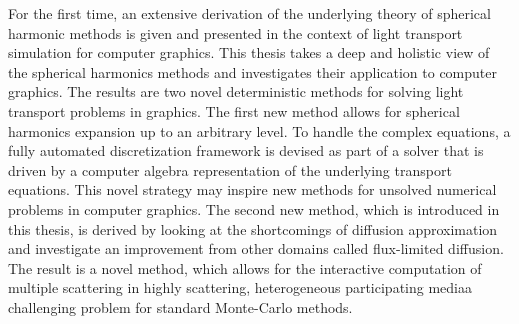 For the first time, an extensive derivation of the underlying theory of spherical harmonic methods is given and presented in the context of light transport simulation for computer graphics. This thesis takes a deep and holistic view of the spherical harmonics methods and investigates their application to computer graphics. The results are two novel deterministic methods for solving light transport problems in graphics. The first new method allows for spherical harmonics expansion up to an arbitrary level. To handle the complex equations, a fully automated discretization framework is devised as part of a solver that is driven by a computer algebra representation of the underlying transport equations. This novel strategy may inspire new methods for unsolved numerical problems in computer graphics. The second new method, which is introduced in this thesis, is derived by looking at the shortcomings of diffusion approximation and investigate an improvement from other domains called flux-limited diffusion. The result is a novel method, which allows for the interactive computation of multiple scattering in highly scattering, heterogeneous participating media\mydash a challenging problem for standard Monte-Carlo methods.